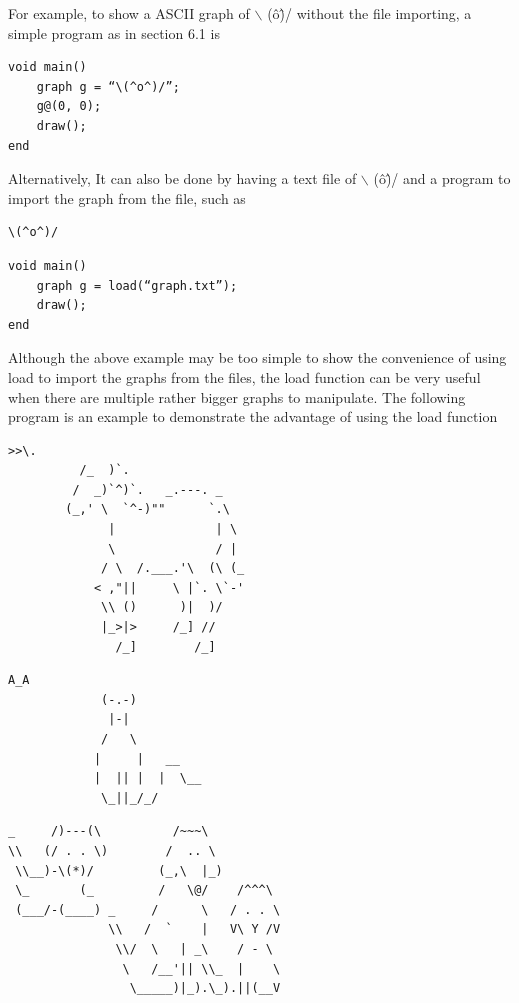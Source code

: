 \documentclass[11pt,letterpaper]{article}
\begin{document}
For example, to show a ASCII graph of $\backslash$ (\^o\^)/ without the file importing, a simple program as in section 6.1 is
\begin{lstlisting}[caption=hail.adl, label=hail, captionpos=b]
void main()
	graph g = “\(^o^)/”;
	g@(0, 0);
	draw();
end
\end{lstlisting}

Alternatively, It can also be done by having a text file of $\backslash$ (\^o\^)/ and a program to import the graph from the file, such as

\begin{lstlisting}[caption=graph.txt, label=hail_face, captionpos=b]
	\(^o^)/
\end{lstlisting}

\begin{lstlisting}[caption=hailv2.adl, label=hailv2, captionpos=b]
void main()
	graph g = load(“graph.txt”);
	draw();
end
\end{lstlisting}

Although the above example may be too simple to show the convenience of using load to import the graphs from the files, the load function can be very useful when there are multiple rather bigger graphs to manipulate. The following program is an example to demonstrate the advantage of using the load function

\begin{lstlisting}[caption=graph\_horse.txt, label=horse, captionpos=b]
		   >>\.
		  /_  )`.
		 /  _)`^)`.   _.---. _
		(_,' \  `^-)""      `.\
		      |              | \
		      \              / |
		     / \  /.___.'\  (\ (_
		    < ,"||     \ |`. \`-'
		     \\ ()      )|  )/
		     |_>|>     /_] //
		       /_]        /_]
\end{lstlisting}

\begin{lstlisting}[caption=graph\_cat.txt, label=cat, captionpos=b]
			  A_A
			 (-.-)
			  |-|
			 /   \
			|     |   __
			|  || |  |  \__
			 \_||_/_/
\end{lstlisting}

\begin{lstlisting}[caption=graph\_dogs.txt, label=dogs, captionpos=b]
_     /)---(\          /~~~\
\\   (/ . . \)        /  .. \
 \\__)-\(*)/         (_,\  |_)
 \_       (_         /   \@/    /^^^\
 (___/-(____) _     /      \   / . . \
              \\   /  `    |   V\ Y /V
               \\/  \   | _\    / - \
                \   /__'|| \\_  |    \
                 \_____)|_).\_).||(__V
\end{lstlisting}
\end{document}
